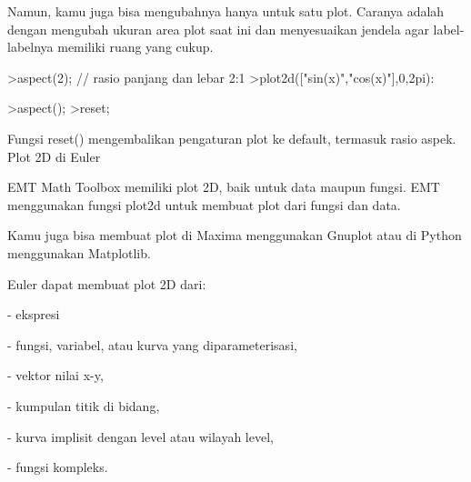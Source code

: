 \documentclass[a4paper,10pt]{article}
\begin{document}
\begin{eulernotebook}
\begin{eulercomment}
\begin{eulercomment}
\begin{eulercomment}
\begin{eulercomment}
\begin{eulercomment}
\begin{eulercomment}
\begin{eulercomment}
\begin{eulercomment}
\begin{eulercomment}
\begin{eulercomment}
\begin{eulercomment}
\begin{eulercomment}
\begin{eulercomment}
\begin{eulercomment}
\begin{eulercomment}
\begin{eulercomment}
\begin{eulercomment}
\begin{eulercomment}
\begin{eulercomment}
\begin{eulercomment}
\begin{eulercomment}
\begin{eulercomment}
\begin{eulercomment}
\begin{eulercomment}
\begin{eulercomment}
\begin{eulercomment}
\begin{eulercomment}
\begin{eulercomment}
\begin{eulercomment}
\begin{eulercomment}
\begin{eulercomment}
\begin{eulercomment}
\begin{eulercomment}
\begin{eulercomment}
\begin{eulercomment}
\begin{eulercomment}
\begin{eulercomment}
Namun, kamu juga bisa mengubahnya hanya untuk satu plot. Caranya
adalah dengan mengubah ukuran area plot saat ini dan menyesuaikan
jendela agar label-labelnya memiliki ruang yang cukup.
\end{eulercomment}
\begin{eulerprompt}
>aspect(2); // rasio panjang dan lebar 2:1
>plot2d(["sin(x)","cos(x)"],0,2pi):
\end{eulerprompt}
\begin{eulerprompt}
>aspect();
>reset;
\end{eulerprompt}
\begin{eulercomment}
Fungsi reset() mengembalikan pengaturan plot ke default, termasuk
rasio aspek.\\
Plot 2D di Euler

EMT Math Toolbox memiliki plot 2D, baik untuk data maupun fungsi. EMT
menggunakan fungsi plot2d untuk membuat plot dari fungsi dan data.

Kamu juga bisa membuat plot di Maxima menggunakan Gnuplot atau di
Python menggunakan Matplotlib.

Euler dapat membuat plot 2D dari:

- ekspresi

- fungsi, variabel, atau kurva yang diparameterisasi,

- vektor nilai x-y,

- kumpulan titik di bidang,

- kurva implisit dengan level atau wilayah level,

- fungsi kompleks.


\end{eulercomment}
\end{eulercomment}
\end{eulercomment}
\end{eulercomment}
\end{eulercomment}
\end{eulercomment}
\end{eulercomment}
\end{eulercomment}
\end{eulercomment}
\end{eulercomment}
\end{eulercomment}
\end{eulercomment}
\end{eulercomment}
\end{eulercomment}
\end{eulercomment}
\end{eulercomment}
\end{eulercomment}
\end{eulercomment}
\end{eulercomment}
\end{eulercomment}
\end{eulercomment}
\end{eulercomment}
\end{eulercomment}
\end{eulercomment}
\end{eulercomment}
\end{eulercomment}
\end{eulercomment}
\end{eulercomment}
\end{eulercomment}
\end{eulercomment}
\end{eulercomment}
\end{eulercomment}
\end{eulercomment}
\end{eulercomment}
\end{eulercomment}
\end{eulercomment}
\end{eulercomment}
\end{eulernotebook}
\end{document}
